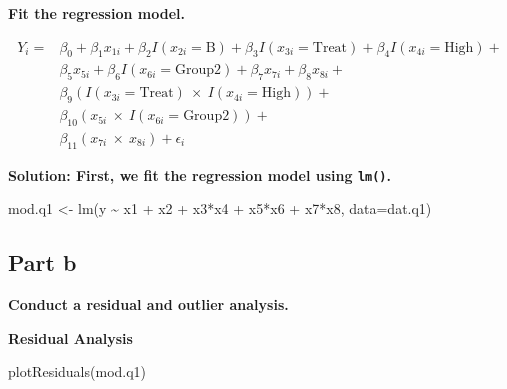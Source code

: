 \documentclass[
]{article}
\newenvironment{Shaded}{\begin{snugshade}}{\end{snugshade}}
\newcommand{\AttributeTok}[1]{\textcolor[rgb]{0.40,0.45,0.13}{#1}}
\newcommand{\FunctionTok}[1]{\textcolor[rgb]{0.28,0.35,0.67}{#1}}
\newcommand{\NormalTok}[1]{\textcolor[rgb]{0.00,0.23,0.31}{#1}}
\newcommand{\OtherTok}[1]{\textcolor[rgb]{0.00,0.23,0.31}{#1}}
\newcommand{\SpecialCharTok}[1]{\textcolor[rgb]{0.37,0.37,0.37}{#1}}
\begin{document}
\textbf{Fit the regression model.}

\begin{align*}
  Y_i =& \beta_0  +
       \beta_1 x_{1i} + \beta_2 I(x_{2i}=\text{B})+ \beta_3 I(x_{3i}=\text{Treat}) + \beta_4 I(x_{4i}=\text{High}) +\\
       & \beta_5 x_{5i} + \beta_6 I( x_{6i}=\text{Group2}) + \beta_7 x_{7i} + \beta_8 x_{8i}+\\
       & \beta_9 (I(x_{3i}=\text{Treat}) ~\times~ I(x_{4i}=\text{High})) + \tag{Categorical $\times$ Categorical}\\
        & \beta_{10} (x_{5i} ~\times~ I(x_{6i}=\text{Group2})) +\tag{Continuous $\times$ Categorical}\\
        & \beta_{11} (x_{7i} ~\times~ x_{8i}) +
         \epsilon_i \tag{Continuous $\times$ Continuous}
\end{align*}

\textbf{Solution: First, we fit the regression model using
\texttt{lm()}.}

\scriptsize

\begin{Shaded}
\begin{Highlighting}[numbers=left,,]
\NormalTok{mod.q1 }\OtherTok{\textless{}{-}} \FunctionTok{lm}\NormalTok{(y }\SpecialCharTok{\textasciitilde{}}\NormalTok{ x1 }\SpecialCharTok{+}\NormalTok{ x2 }\SpecialCharTok{+}\NormalTok{ x3}\SpecialCharTok{*}\NormalTok{x4 }\SpecialCharTok{+}\NormalTok{ x5}\SpecialCharTok{*}\NormalTok{x6 }\SpecialCharTok{+}\NormalTok{ x7}\SpecialCharTok{*}\NormalTok{x8, }\AttributeTok{data=}\NormalTok{dat.q1)}
\end{Highlighting}
\end{Shaded}

\normalsize

\subsection{Part b}\label{part-b}

\textbf{Conduct a residual and outlier analysis.}

\textbf{Residual Analysis}

\normalsize

\begin{Shaded}
\begin{Highlighting}[numbers=left,,]
\FunctionTok{plotResiduals}\NormalTok{(mod.q1)}
\end{Highlighting}
\end{Shaded}
\end{document}
